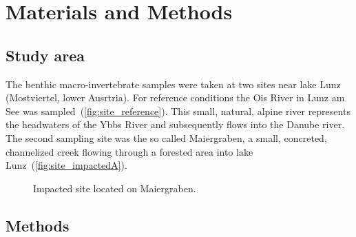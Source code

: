 

\section{Materials and Methods}\label{sec:material_methods}          %

\subsection{Study area}\label{sec:study_area}                %




The benthic macro-invertebrate samples were taken at two sites near lake Lunz (Mostviertel, lower Ausrtria). For reference conditions the Ois River in Lunz am See was sampled~(\cref{fig:site_reference}). This small, natural, alpine river represents the headwaters of the Ybbs River and subsequently flows into the Danube river. The second sampling site was the so called Maiergraben, a small, concreted, channelized creek flowing through a forested area into lake Lunz~(\cref{fig:site_impactedA}).



\begin{figure}[!htb]                                                        %
\centering                                                                  %
  \hfill                                                                                    %
  \hspace*{\fill}                                                                           %
\caption{Impacted site located on Maiergraben.}\label{fig:site_impacted}          %
\end{figure}




\subsection{Methods}\label{sec:methods}                         %

